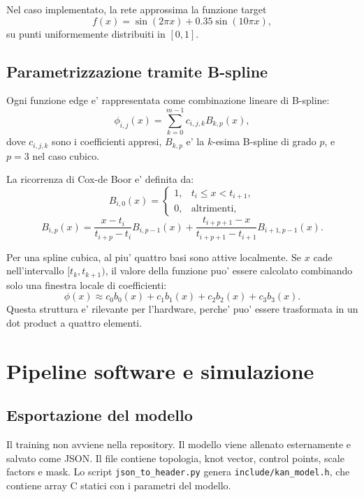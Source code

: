 \documentclass[conference]{IEEEtran}
\begin{document}
Nel caso implementato, la rete approssima la funzione target
\begin{equation}
    f(x) = \sin(2\pi x) + 0.35\sin(10\pi x),
\end{equation}
su punti uniformemente distribuiti in $[0,1]$.

\subsection{Parametrizzazione tramite B-spline}
Ogni funzione edge e' rappresentata come combinazione lineare di B-spline:
\begin{equation}
    \phi_{i,j}(x) = \sum_{k=0}^{m-1} c_{i,j,k} B_{k,p}(x),
\end{equation}
dove $c_{i,j,k}$ sono i coefficienti appresi, $B_{k,p}$ e' la $k$-esima B-spline di grado $p$, e $p=3$ nel caso cubico.

La ricorrenza di Cox-de Boor e' definita da:
\begin{equation}
B_{i,0}(x) =
\begin{cases}
1, & t_i \le x < t_{i+1},\\
0, & \text{altrimenti},
\end{cases}
\end{equation}
\begin{equation}
B_{i,p}(x) =
\frac{x-t_i}{t_{i+p}-t_i}B_{i,p-1}(x)
+
\frac{t_{i+p+1}-x}{t_{i+p+1}-t_{i+1}}B_{i+1,p-1}(x).
\end{equation}

Per una spline cubica, al piu' quattro basi sono attive localmente. Se $x$ cade nell'intervallo $[t_k,t_{k+1})$, il valore della funzione puo' essere calcolato combinando solo una finestra locale di coefficienti:
\begin{equation}
    \phi(x) \approx c_0 b_0(x) + c_1 b_1(x) + c_2 b_2(x) + c_3 b_3(x).
\end{equation}
Questa struttura e' rilevante per l'hardware, perche' puo' essere trasformata in un dot product a quattro elementi.

\section{Pipeline software e simulazione}
\subsection{Esportazione del modello}
Il training non avviene nella repository. Il modello viene allenato esternamente e salvato come JSON. Il file contiene topologia, knot vector, control points, scale factors e mask. Lo script \texttt{json\_to\_header.py} genera \texttt{include/kan\_model.h}, che contiene array C statici con i parametri del modello.
\end{document}
